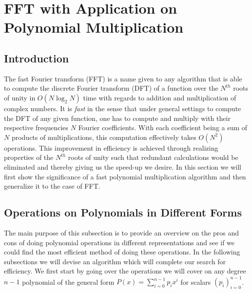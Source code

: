 \documentclass[../article.tex]{subfiles}
\begin{document}
\section{FFT with Application on Polynomial Multiplication}
\subsection{Introduction}
The fast Fourier transform (FFT) is a name given to any algorithm that is able to compute the discrete Fourier transform (DFT) of a function over the $N^{th}$ roots of unity in $O(N\log_2{N})$ time with regards to addition and multiplication of complex numbers. It is \emph{fast} in the sense that under general settings to compute the DFT of any given function, one has to compute and multiply with their respective frequencies $N$ Fourier coefficients. With each coefficient being a sum of $N$ products of multiplications, this computation effectively takes $O(N^2)$ operations. This improvement in efficiency is achieved through realizing properties of the $N^{th}$ roots of unity such that redundant calculations would be eliminated and thereby giving us the speed-up we desire. In this section we will first show the significance of a fast polynomial multiplication algorithm and then generalize it to the case of FFT.

\subsection{Operations on Polynomials in Different Forms}
The main purpose of this subsection is to provide an overview on the pros and cons of doing polynomial operations in different representations and see if we could find the most efficient method of doing these operations. In the following subsections we will devise an algorithm which will complete our search for efficiency. We first start by going over the operations we will cover on any degree $n-1$ polynomial of the general form $P(x) = \sum_{i=0}^{n-1} p_ix^i$ for scalars $(p_i)_{i=0}^{n-1}$.
\end{document}
